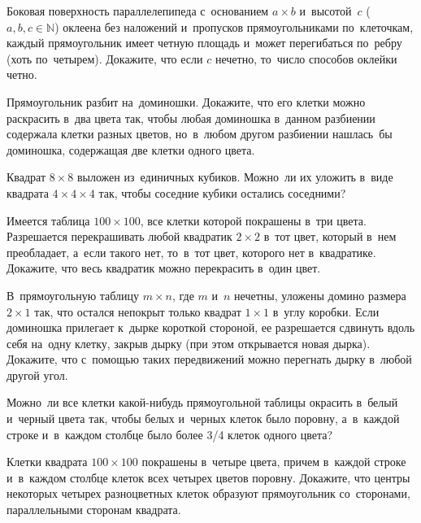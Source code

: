 


\begin{problems}

\item
Боковая поверхность параллелепипеда с~основанием $a\times b$ и~высотой~$c$
($a, b, c \in \mathbb{N}$) оклеена без наложений и~пропусков прямоугольниками
по~клеточкам, каждый прямоугольник имеет четную площадь и~может перегибаться
по~ребру (хоть по~четырем).
Докажите, что если $c$ нечетно, то~число способов оклейки четно.

\item
Прямоугольник разбит на~доминошки.
Докажите, что его клетки можно раскрасить в~два цвета так, чтобы любая
доминошка в~данном разбиении содержала клетки разных цветов, но~в~любом другом
разбиении нашлась~бы доминошка, содержащая две клетки одного цвета.

\item
Квадрат $8 \times 8$ выложен из~единичных кубиков.
Можно~ли их уложить в~виде квадрата $4 \times 4 \times 4$ так, чтобы соседние
кубики остались соседними?

\item
Имеется таблица $100 \times 100$, все клетки которой покрашены в~три цвета.
Разрешается перекрашивать любой квадратик $2 \times 2$ в~тот цвет, который
в~нем преобладает, а~если такого нет, то~в~тот цвет, которого нет в~квадратике.
Докажите, что весь квадратик можно перекрасить в~один цвет.

\item
В~прямоугольную таблицу $m \times n$, где $m$ и~$n$ нечетны, уложены домино
размера $2 \times 1$ так, что остался непокрыт только квадрат $1 \times 1$
в~углу коробки.
Если доминошка прилегает к~дырке короткой стороной, ее разрешается сдвинуть
вдоль себя на~одну клетку, закрыв дырку (при этом открывается новая дырка).
Докажите, что с~помощью таких передвижений можно перегнать дырку в~любой другой
угол.

\item
Можно~ли все клетки какой-нибудь прямоугольной таблицы окрасить в~белый
и~черный цвета так, чтобы белых и~черных клеток было поровну, а~в~каждой строке
и~в~каждом столбце было более 3/4 клеток одного цвета?

\item
Клетки квадрата $100 \times 100$ покрашены в~четыре цвета, причем в~каждой
строке и~в~каждом столбце клеток всех четырех цветов поровну.
Докажите, что центры некоторых четырех разноцветных клеток образуют
прямоугольник со~сторонами, параллельными сторонам квадрата.

\end{problems}

